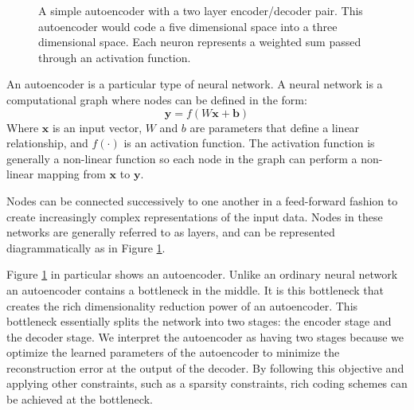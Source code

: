 \begin{figure}
\centering

\caption{
A simple autoencoder with a two layer encoder/decoder pair. This autoencoder
would code a five dimensional space into a three dimensional space. Each neuron represents a weighted sum passed through an activation function.
}
\label{autoenc}
\end{figure}

An autoencoder is a particular type of neural network. A neural network is a computational graph where nodes can be
defined in the form: 
\begin{equation}
\mathbf{y} = f\left(W\mathbf{x} + \mathbf{b}\right)
\label{dense}
\end{equation}
Where $\mathbf{x}$ is an input vector, $W$ and $b$ are parameters that define a
linear relationship, and $f(\cdot)$ is an activation function. The activation
function is generally a non-linear function so each node in the graph can
perform a non-linear mapping from $\mathbf{x}$ to $\mathbf{y}$.

Nodes can be connected successively to one another in a feed-forward fashion to
create increasingly complex representations of the input data. Nodes in these
networks are generally referred to as layers, and can be represented
diagrammatically as in Figure \ref{autoenc}. 

Figure \ref{autoenc} in particular shows an autoencoder. Unlike an ordinary
neural network an autoencoder contains a bottleneck in the middle. It is this
bottleneck that creates the rich dimensionality reduction power of an
autoencoder. This bottleneck essentially splits the network into two stages:
the encoder stage and the decoder stage. We interpret the autoencoder as
having two stages because we optimize the learned parameters of the
autoencoder to minimize the reconstruction error at the output of the decoder.
By following this objective and applying other constraints, such as a sparsity constraints, rich coding schemes can be achieved at the bottleneck.
